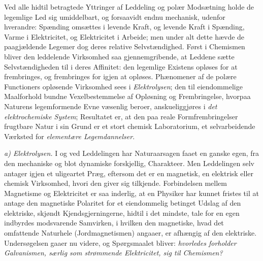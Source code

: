 \documentclass[12pt,a4paper]{book}
\newcommand{\runin}[1]{\emph{#1}\hspace{0.4em}}
\begin{document}
Ved alle hidtil betragtede Yttringer af Leddeling og polær Modsætning
holde de legemlige Led sig umiddelbart, og forsaavidt endnu mechanisk,
udenfor hverandre: Spænding omsættes i levende Kraft, og levende Kraft i
Spænding, Varme i Elektricitet, og Elektricitet i Arbeide; men under alt
dette hævde de paagjældende Legemer dog deres relative Selvstændighed.
Først i Chemismen bliver den leddelende Virksomhed saa gjennemgribende,
at Leddene sætte Selvstændigheden til i deres Affinitet: den legemlige
Existens opløses for at frembringes, og frembringes for igjen at opløses.
Phænomener af de polære Functioners opløsende Virksomhed sees i
\emph{Elektrolysen}; den til eiendommelige Maalforhold bundne
Vexelbestemmelse af Opløsning og Frembringelse, hvorpaa Naturens
legemformende Evne væsenlig beroer, anskueliggjøres i \emph{det
elektrochemiske System}; Resultatet er, at den paa reale
Formfrembringelser frugtbare Natur i sin Grund er et stort chemisk
Laboratorium, et selvarbeidende Værksted for \emph{elementære
Legemdannelser}.

\runin{a) Elektrolysen.} I og ved Leddelingen har Naturaarsagen faaet en
ganske egen, fra den mechaniske og blot dynamiske forskjellig, Charakteer.
Men Leddelingen selv antager igjen et uligeartet Præg, eftersom det er en
magnetisk, en elektrisk eller chemisk Virksomhed, hvori den giver sig
tilkjende. Forbindelsen mellem Magnetisme og Elektricitet er saa inderlig,
at en Physiker har kunnet fristes til at antage den magnetiske Polaritet
for et eiendommelig betinget Udslag af den elektriske, skjøndt
Kjendsgjerningerne, hidtil i det mindste, tale for en egen indbyrdes
modsvarende Samvirken, i hvilken den magnetiske, hvad det omfattende
Naturhele (Jordmagnetismen) angaaer, er afhængig
af den elektriske. Undersøgelsen gaaer nu videre, og Spørgsmaalet bliver:
\emph{hvorledes forholder Galvanismen, særlig som strømmende Elektricitet,
sig til Chemismen?}
\end{document}
